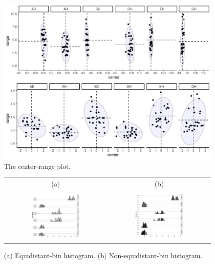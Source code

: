 \documentclass[article]{jss}
\begin{document}
\begin{appendix}
\begin{figure}[t!]
\centering
\includegraphics[width=1\textwidth]{pic/box_centerRange_after}
\caption{\label{fig:centerRange} The center-range plot.}
\end{figure}



\begin{figure}[t!]
\centering
\begin{tabular}{cc}
(a) & (b) \\
\includegraphics[width=0.5\textwidth]{pic/hist_equal} &
\includegraphics[width=0.5\textwidth]{pic/hist_unequal}
\end{tabular}
\caption{\label{fig:hist} (a) Equidistant-bin histogram. (b) Non-equidistant-bin histogram.}
\end{figure}




\end{appendix}
\end{document}

